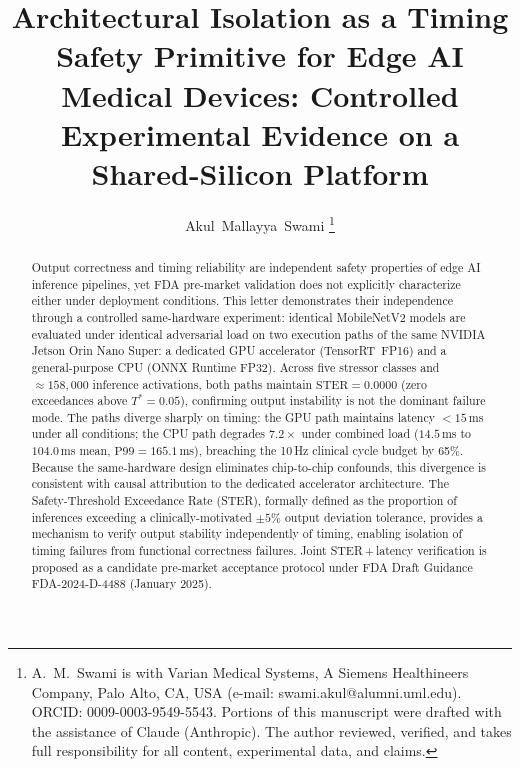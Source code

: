 \documentclass[journal,10pt,twocolumn]{IEEEtran}
\begin{document}
\title{Architectural Isolation as a Timing Safety Primitive for Edge AI
Medical Devices: Controlled Experimental Evidence on a Shared-Silicon Platform}

\author{Akul~Mallayya~Swami%
  \thanks{A.~M.~Swami is with Varian Medical Systems, A Siemens
  Healthineers Company, Palo Alto, CA, USA
  (e-mail: swami.akul@alumni.uml.edu).
  ORCID: 0009-0003-9549-5543.
  Portions of this manuscript were drafted with the assistance of Claude
  (Anthropic). The author reviewed, verified, and takes full responsibility
  for all content, experimental data, and claims.}}

\maketitle

\begin{abstract}
Output correctness and timing reliability are independent safety properties
of edge AI inference pipelines, yet FDA pre-market validation does not
explicitly characterize either under deployment conditions.
This letter demonstrates their independence through a controlled
same-hardware experiment: identical MobileNetV2 models are evaluated
under identical adversarial load on two execution paths of the same
NVIDIA Jetson Orin Nano Super: a dedicated GPU accelerator
(TensorRT~FP16) and a general-purpose CPU (ONNX Runtime FP32).
Across five stressor classes and ${\approx}158{,}000$ inference
activations, both paths maintain
$\mathrm{STER}{=}0.0000$ (zero exceedances above $T^*{=}0.05$),
confirming output instability is not the dominant failure mode.
The paths diverge sharply on timing: the GPU path maintains latency
${<}15$\,ms under all conditions; the CPU path degrades $7.2{\times}$
under combined load ($14.5$\,ms to $104.0$\,ms mean,
$\mathrm{P99}{=}165.1$\,ms), breaching the 10\,Hz clinical cycle budget
by 65\%.
Because the same-hardware design eliminates chip-to-chip confounds,
this divergence is consistent with causal attribution to the dedicated
accelerator architecture.
The Safety-Threshold Exceedance Rate (STER), formally defined as the
proportion of inferences exceeding a clinically-motivated ${\pm}5\%$
output deviation tolerance, provides a mechanism to verify output
stability independently of timing, enabling isolation of timing failures
from functional correctness failures.
Joint STER\,+\,latency verification is proposed as a candidate
pre-market acceptance protocol under FDA Draft Guidance
FDA-2024-D-4488 (January 2025).
\end{abstract}
\end{document}
